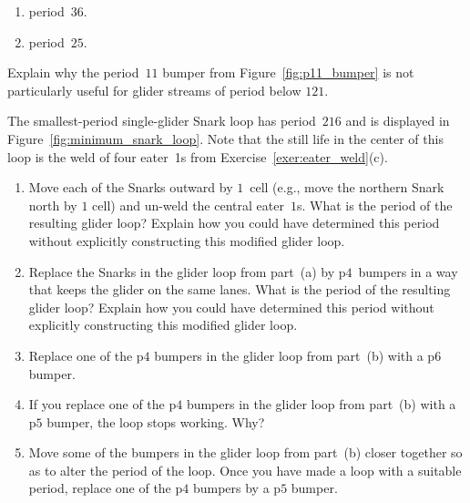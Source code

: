 \begin{multicols}{2}
\begin{problem}
\begin{enumerate}[label=\bf\color{ocre}(\alph*)]
			\item period~$36$.
			
			\item period~$25$.
		\end{enumerate}
	\end{problem}
	
	
	\mfilbreak
	
	
	\begin{problemstar}\label{exer:p11_bumper_not_useful} 
		Explain why the period~$11$ bumper from Figure~\ref{fig:p11_bumper} is not particularly useful for glider streams of period below $121$.
		
	\end{problemstar}
	
	
	\mfilbreak
	
	
	\begin{problemstar}\label{exer:minimum_period_snark_loop}
		The smallest-period single-glider Snark loop has period~$216$ and is displayed in Figure~\ref{fig:minimum_snark_loop}. Note that the still life in the center of this loop is the weld of four eater~1s from Exercise~\ref{exer:eater_weld}(c).\smallskip
		
		\begin{enumerate}[label=\bf\color{ocre}(\alph*)]
			\item {} Move each of the Snarks outward by $1$~cell (e.g., move the northern Snark north by $1$ cell) and un-weld the central eater~$1$s. What is the period of the resulting glider loop? Explain how you could have determined this period without explicitly constructing this modified glider loop.
			
			\item {} Replace the Snarks in the glider loop from part~(a) by p$4$~bumpers in a way that keeps the glider on the same lanes. What is the period of the resulting glider loop? Explain how you could have determined this period without explicitly constructing this modified glider loop.
			
			\item {} Replace one of the p$4$ bumpers in the glider loop from part~(b) with a p$6$ bumper.
			
			\item {} If you replace one of the p$4$ bumpers in the glider loop from part~(b) with a p$5$ bumper, the loop stops working. Why?
			
			\item {} Move some of the bumpers in the glider loop from part~(b) closer together so as to alter the period of the loop. Once you have made a loop with a suitable period, replace one of the p$4$ bumpers by a p$5$ bumper.
			

\end{enumerate}
\end{problemstar}
\end{multicols}
